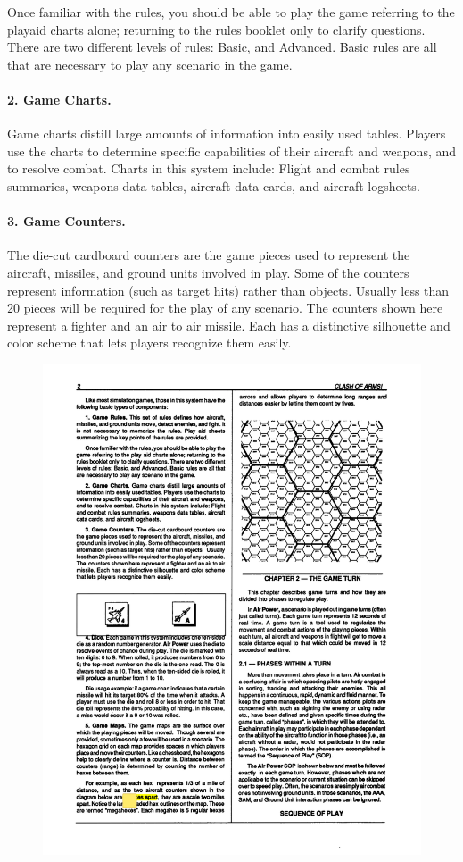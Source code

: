 Once familiar with the rules, you should be able to play the game referring to the play{\xhyphen}aid charts alone; returning to the rules booklet only to clarify questions. There are two different levels of rules: Basic, and Advanced. Basic rules are all that are necessary to play any scenario in the game.

\paragraph{2. Game Charts.} Game charts distill large amounts of information into easily used tables. Players use the charts to determine specific capabilities of their aircraft and weapons, and to resolve combat. Charts in this system include: Flight and combat rules summaries, weapons data tables, aircraft data cards, and aircraft logsheets.

\paragraph{3. Game Counters.} The die-cut cardboard counters are the game pieces used to represent the aircraft, missiles, and ground units involved in play. Some of the counters represent information (such as target hits) rather than objects. Usually less than 20 pieces will be required for the play of any scenario. The counters shown here represent a fighter and an air to air missile. Each has a distinctive silhouette and color scheme that lets players recognize them easily.

\begin{figure}[h!]
\centering
\includegraphics[width=\linewidth]{figures/figure-counters.pdf}
\end{figure}

